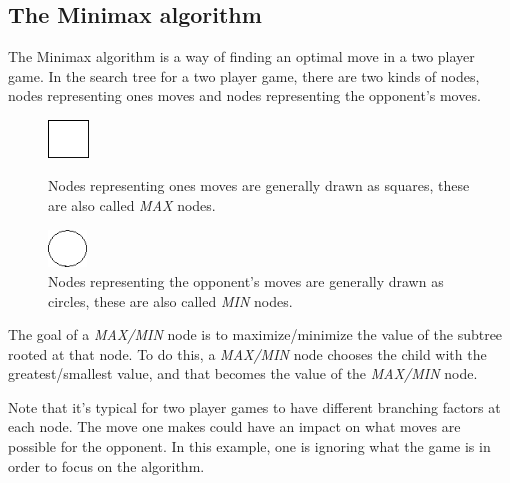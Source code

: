 \subsection{The Minimax algorithm}
The Minimax algorithm is a way of finding an optimal move in a two player game. In the search tree for a two player game, there are two kinds of nodes, nodes representing ones moves and nodes representing the opponent's moves.\cite{graphics_minimax}
\begin{figure}[H]
\centering
	\begin{minipage}[b]{0.45\linewidth}
		\centering
		\includegraphics[height=1cm]{2_State_of_the_art/Arimaa_on_MCTS_Benoit/img/max.png}
		\caption{\label{fig:max}Nodes representing ones moves are generally drawn as squares, these are also called \emph{MAX} nodes.}
	\end{minipage}%
	\hspace*{1cm}
	\begin{minipage}[b]{0.45\linewidth}
		\centering
		\includegraphics[height=1cm]{2_State_of_the_art/Arimaa_on_MCTS_Benoit/img/min.png}
		\caption{\label{fig:min}Nodes representing the opponent's moves are generally drawn as circles, these are also called \emph{MIN} nodes.}
	\end{minipage}%
\end{figure}

The goal of a \emph{MAX/MIN} node is to maximize/minimize the value of the subtree rooted at that node. To do this, a \emph{MAX/MIN} node chooses the child with the greatest/smallest value, and that becomes the value of the \emph{MAX/MIN} node.

Note that it's typical for two player games to have different branching factors at each node. The move one makes could have an impact on what moves are possible for the opponent. In this example, one is ignoring what the game is in order to focus on the algorithm.


